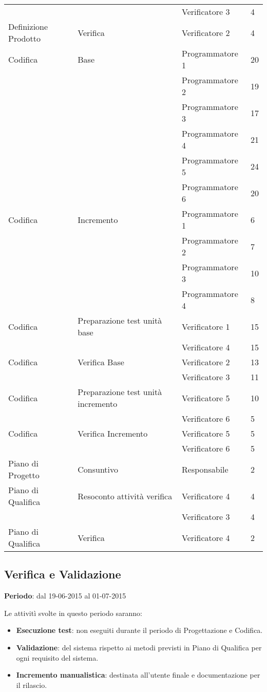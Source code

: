 {{\begin{longtable} [c]{| l | l | l | l |}
		 &	&	Verificatore 3 & 4\\
		 Definizione Prodotto & Verifica & Verificatore 2 & 4 \\
		 Codifica & Base & Programmatore 1 & 20\\
		 &	&	Programmatore 2 & 19\\
		 &	&	Programmatore 3 & 17\\
		 &	&	Programmatore 4 & 21\\
		 &	&	Programmatore 5 & 24\\
		 &	&	Programmatore 6 & 20\\
		 Codifica & Incremento & Programmatore 1 & 6\\
		 &	&	Programmatore 2 & 7\\
		 &	&	Programmatore 3 & 10\\
		 &	&	Programmatore 4 & 8\\
		 Codifica & Preparazione test unità base & Verificatore 1 & 15\\
		 &	&	Verificatore 4 & 15\\
		 Codifica & Verifica Base & Verificatore 2 & 13\\
		 &	&	Verificatore 3 & 11\\
		 Codifica & Preparazione test unità incremento & Verificatore 5 & 10\\
		 &	&	Verificatore 6 & 5\\
		 Codifica & Verifica Incremento & Verificatore 5 & 5\\
		 &	&	Verificatore 6 & 5\\
		 Piano di Progetto & Consuntivo & Responsabile & 2 \\
		 Piano di Qualifica & Resoconto attività verifica & Verificatore 4 & 4\\
		 &	&	Verificatore 3 & 4\\
		 Piano di Qualifica & Verifica & Verificatore 4 & 2 \\
	\end{longtable}
}
\subsection{Verifica e Validazione}{
	\textbf{Periodo}: dal 19-06-2015 al 01-07-2015
	
	Le attivitì svolte in questo periodo saranno:
	\begin{itemize}
		\item \textbf{Esecuzione test}: non eseguiti durante il periodo di Progettazione e Codifica.
		\item \textbf{Validazione}: del sistema rispetto ai metodi previsti in Piano di Qualifica per ogni requisito del sistema.
		\item \textbf{Incremento manualistica}: destinata all'utente finale e documentazione per il rilascio.
	\end{itemize}
	
}}
